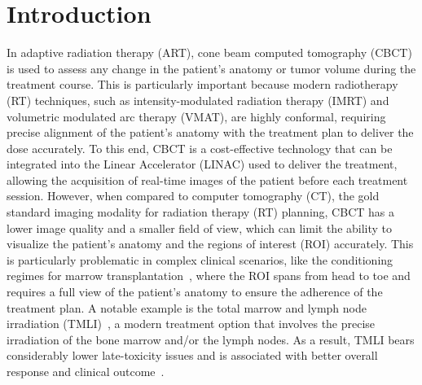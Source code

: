 \section{Introduction}
In adaptive radiation therapy (ART), cone beam computed tomography (CBCT) is used to assess any change in the patient's anatomy or tumor volume during the treatment course.
This is particularly important because modern radiotherapy (RT) techniques, such as intensity-modulated radiation therapy (IMRT) and volumetric modulated arc therapy (VMAT), are highly conformal, requiring precise alignment of the patient's anatomy with the treatment plan to deliver the dose accurately.
To this end, CBCT is a cost-effective technology that can be integrated into the Linear Accelerator (LINAC) used to deliver the treatment, allowing the acquisition of real-time images of the patient before each treatment session.
However, when compared to computer tomography (CT), the gold standard imaging modality for radiation therapy (RT) planning, CBCT has a lower image quality and a smaller field of view, which can limit the ability to visualize the patient's anatomy and the regions of interest (ROI) accurately.
This is particularly problematic in complex clinical scenarios, like the conditioning regimes for marrow transplantation~\cite{Passweg2012}, where the ROI spans from head to toe and requires a full view of the patient's anatomy to ensure the adherence of the treatment plan.
A notable example is the total marrow and lymph node irradiation (TMLI)~\cite{Mancosu2019}, a modern treatment option that involves the precise irradiation of the bone marrow and/or the lymph nodes.
As a result, TMLI bears considerably lower late-toxicity issues and is associated with better overall response and clinical outcome~\cite{Cosset1994}. 


